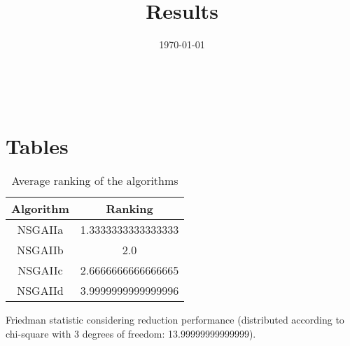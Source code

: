 \documentclass{article}
\title{Results}
\author{}
\date{\today}
\begin{document}
\oddsidemargin 0in \topmargin 0in\maketitle
\
\section{Tables}
\begin{table}[!htp]
\centering
\caption{Average ranking of the algorithms}
\begin{tabular}{c|c}
Algorithm&Ranking\\
\hline
NSGAIIa&1.3333333333333333\\
NSGAIIb&2.0\\
NSGAIIc&2.6666666666666665\\
NSGAIId&3.9999999999999996\\
\end{tabular}
\end{table}


Friedman statistic considering reduction performance (distributed according to chi-square with 3 degrees of freedom: 13.99999999999999).
\end{document}
